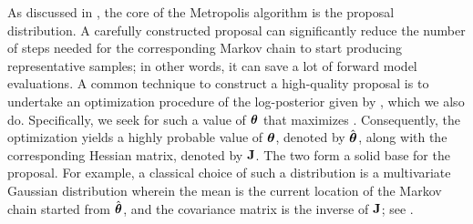 As discussed in , the core of the Metropolis algorithm is the proposal distribution. A carefully constructed proposal can significantly reduce the number of steps needed for the corresponding Markov chain to start producing representative samples; in other words, it can save a lot of forward model evaluations.
A common technique to construct a high-quality proposal is to undertake an optimization procedure of the log-posterior given by , which we also do. Specifically, we seek for such a value of ${\boldsymbol\theta}$ that maximizes .
Consequently, the optimization yields a highly probable value of ${\boldsymbol\theta}$, denoted by $\hat{{\boldsymbol\theta}}$, along with the corresponding Hessian matrix, denoted by $\mathbf{J}$. The two form a solid base for the proposal.
For example, a classical choice of such a distribution is a multivariate Gaussian distribution wherein the mean is the current location of the Markov chain started from $\hat{{\boldsymbol\theta}}$, and the covariance matrix is the inverse of $\mathbf{J}$; see \cite{gelman2004, bernardo2007}.
